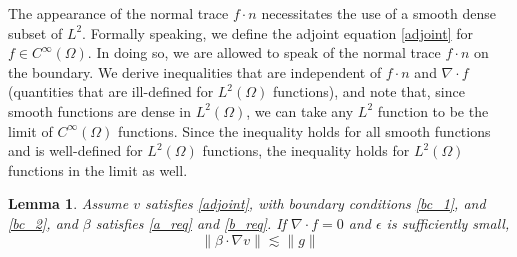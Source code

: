 \documentclass[11pt,onecolumn]{scrartcl}
\newcommand{\grad}{\nabla}
\renewcommand{\div}{\grad \cdot}
\newtheorem{lemma}{Lemma}
\begin{document}
The appearance of the normal trace $f\cdot n$ necessitates the use of a smooth dense subset of $L^2$.  Formally speaking, we define the adjoint equation \eqref{adjoint} for $f\in C^\infty(\Omega)$.  In doing so, we are allowed to speak of the normal trace $f\cdot n$ on the boundary.  We derive inequalities that are independent of $f\cdot n$ and $\div f$ (quantities that are ill-defined for $L^2(\Omega)$ functions), and note that, since smooth functions are dense in $L^2(\Omega)$, we can take any $L^2$ function to be the limit of $C^\infty(\Omega)$ functions.  Since the inequality holds for all smooth functions and is well-defined for $L^2(\Omega)$ functions, the inequality holds for $L^2(\Omega)$ functions in the limit as well.

\begin{lemma} 
\label{lemma_stream}
Assume $v$ satisfies \eqref{adjoint}, with boundary conditions \eqref{bc_1}, and \eqref{bc_2}, and $\beta$ satisfies \eqref{a_req} and \eqref{b_req}.  If $\div f = 0$ and $\epsilon$ is sufficiently small, 
\[
\|\beta \cdot \grad v \| \lesssim \| g\|
\]
\end{lemma}
\end{document}
